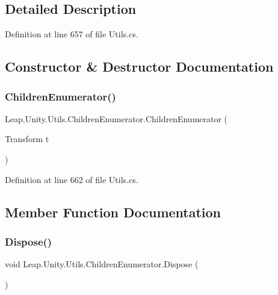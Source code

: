 \subsection{Detailed Description}


Definition at line 657 of file Utils.\+cs.



\subsection{Constructor \& Destructor Documentation}
\mbox{\label{struct_leap_1_1_unity_1_1_utils_1_1_children_enumerator_ad3bf2e5f6ba1faf2762a1a109cc44d0a}} 
\subsubsection{\texorpdfstring{ChildrenEnumerator()}{ChildrenEnumerator()}}
{\footnotesize\ttfamily Leap.\+Unity.\+Utils.\+Children\+Enumerator.\+Children\+Enumerator (\begin{DoxyParamCaption}\item[{Transform}]{t }\end{DoxyParamCaption})}



Definition at line 662 of file Utils.\+cs.



\subsection{Member Function Documentation}
\mbox{\label{struct_leap_1_1_unity_1_1_utils_1_1_children_enumerator_a52710b9027e8afc53f63b3f0302303a8}} 
\subsubsection{\texorpdfstring{Dispose()}{Dispose()}}
{\footnotesize\ttfamily void Leap.\+Unity.\+Utils.\+Children\+Enumerator.\+Dispose (\begin{DoxyParamCaption}{ }\end{DoxyParamCaption})}



